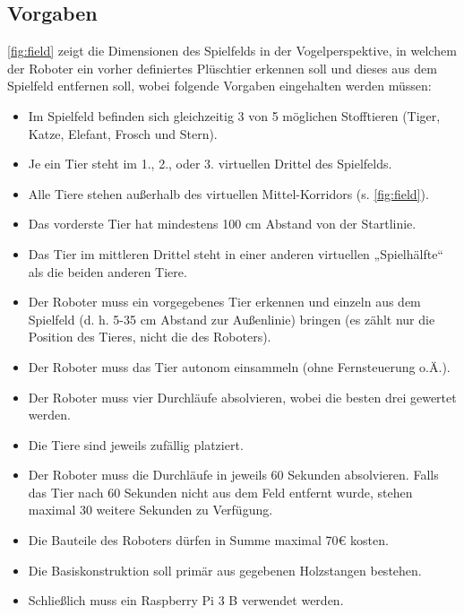 \subsection{Vorgaben}


\autoref{fig:field} zeigt die Dimensionen des Spielfelds in der Vogelperspektive, in welchem der Roboter ein vorher definiertes Plüschtier erkennen soll und dieses aus dem Spielfeld entfernen soll, wobei folgende Vorgaben eingehalten werden müssen:

\begin{itemize}
    \item Im Spielfeld befinden sich gleichzeitig 3 von 5 möglichen Stofftieren (Tiger, Katze, Elefant, Frosch und Stern).
    \item Je ein Tier steht im 1., 2., oder 3. virtuellen Drittel des Spielfelds.
    \item Alle Tiere stehen außerhalb des virtuellen Mittel-Korridors (s. \autoref{fig:field}).
    \item Das vorderste Tier hat mindestens 100 cm Abstand von der Startlinie.
    \item Das Tier im mittleren Drittel steht in einer anderen virtuellen „Spielhälfte“ als die beiden anderen Tiere.
    \item Der Roboter muss ein vorgegebenes Tier erkennen und einzeln aus dem Spielfeld (d. h. 5-35 cm Abstand zur Außenlinie) bringen (es zählt nur die Position des Tieres, nicht die des Roboters).
    \item Der Roboter muss das Tier autonom einsammeln (ohne Fernsteuerung o.Ä.).
    \item Der Roboter muss vier Durchläufe absolvieren, wobei die besten drei gewertet werden.
    \item Die Tiere sind jeweils zufällig platziert.
    \item Der Roboter muss die Durchläufe in jeweils 60 Sekunden absolvieren. Falls das Tier nach 60 Sekunden nicht aus dem Feld entfernt wurde, stehen maximal 30 weitere Sekunden zu Verfügung.
    \item Die Bauteile des Roboters dürfen in Summe maximal 70€ kosten.
    \item Die Basiskonstruktion soll primär aus gegebenen Holzstangen bestehen.
    \item Schließlich muss ein Raspberry Pi 3 B verwendet werden.
\end{itemize}

